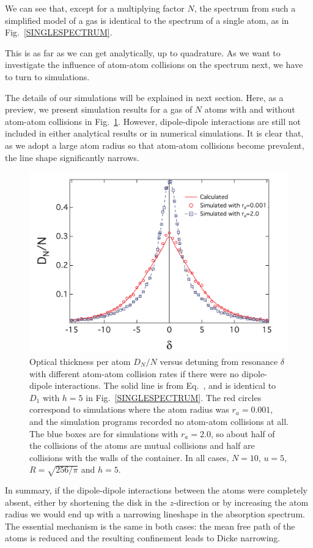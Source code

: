 We can see that, except for a multiplying factor $N$, the spectrum from such a simplified model of a gas is identical to the spectrum of a single atom, as in Fig.~\ref{SINGLESPECTRUM}. 
 
This is as far as we can get analytically, up to quadrature. As we want to investigate the influence of atom-atom collisions on the spectrum next, we have to turn to simulations.

The details of our simulations will be explained in next section. Here, as a preview, we present simulation results for a gas of $N$ atoms with and without atom-atom collisions in Fig.~\ref{COLLISION}. However, dipole-dipole interactions are still not included in either analytical results or in numerical simulations. It is clear that, as we adopt a large atom radius so that atom-atom collisions become prevalent, the line shape significantly narrows.

\begin{figure}[h!]
\begin{center}
\includegraphics[width=\textwidth]{COLLISION.pdf}
\end{center}
\caption{Optical thickness per atom $D_N/N$ versus detuning from resonance $\delta$ with different atom-atom collision rates if there were no dipole-dipole interactions. The solid line is from Eq.~, and is identical to $D_1$ with $h=5$ in Fig.~\ref{SINGLESPECTRUM}. The red circles correspond to simulations where the atom radius was $r_a=0.001$, and the simulation programs recorded no atom-atom collisions at all. The blue boxes are for simulations with $r_a=2.0$, so about half of the collisions of the atoms are mutual collisions and half are collisions with the walls of the container. In all cases, $N=10$, $u=5$, $R=\sqrt{256/\pi}$ and $h=5$.}
\label{COLLISION}
\end{figure}
In summary, if the dipole-dipole interactions between the atoms were completely absent, either by shortening the disk in the $z$-direction or by increasing the atom radius we would end up with a narrowing lineshape in the absorption spectrum. The essential mechanism is the same in both cases: the mean free path of the atoms is reduced and the resulting confinement leads to Dicke narrowing.

